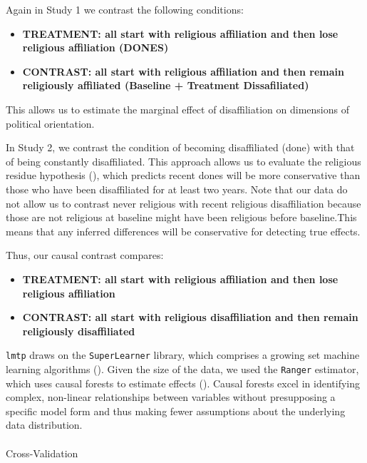 \documentclass[
  singlecolumn]{article}
\makeatletter
\let\oldparagraph\paragraph
\renewcommand{\paragraph}{
    \@ifstar
      \xxxParagraphStar
      \xxxParagraphNoStar
  }
\newcommand{\xxxParagraphStar}[1]{\oldparagraph*{#1}\mbox{}}
\newcommand{\xxxParagraphNoStar}[1]{\oldparagraph{#1}\mbox{}}
\makeatother
\begin{document}
Again in Study 1 we contrast the following conditions:

\begin{itemize}
\item
  \textbf{TREATMENT: all start with religious affiliation and then lose
  religious affiliation (DONES)}
\item
  \textbf{CONTRAST: all start with religious affiliation and then remain
  religiously affiliated (Baseline + Treatment Dissafiliated) }
\end{itemize}

This allows us to estimate the marginal effect of disaffiliation on
dimensions of political orientation.

In Study 2, we contrast the condition of becoming disaffiliated (done)
with that of being constantly disaffiliated. This approach allows us to
evaluate the religious residue hypothesis
(), which
predicts recent dones will be more conservative than those who have been
disaffiliated for at least two years. Note that our data do not allow us
to contrast never religious with recent religious disaffiliation because
those are not religious at baseline might have been religious before
baseline.This means that any inferred differences will be conservative
for detecting true effects.

Thus, our causal contrast compares:

\begin{itemize}
\item
  \textbf{TREATMENT: all start with religious affiliation and then lose
  religious affiliation}
\item
  \textbf{CONTRAST: all start with religious disaffiliation and then
  remain religiously disaffiliated}
\end{itemize}

\texttt{lmtp} draws on the \texttt{SuperLearner} library, which
comprises a growing set machine learning algorithms
(). Given the
size of the data, we used the \texttt{Ranger} estimator, which uses
causal forests to estimate effects (). Causal forests excel in identifying complex, non-linear
relationships between variables without presupposing a specific model
form and thus making fewer assumptions about the underlying data
distribution.

\paragraph{Cross-Validation}\label{cross-validation}
\end{document}
